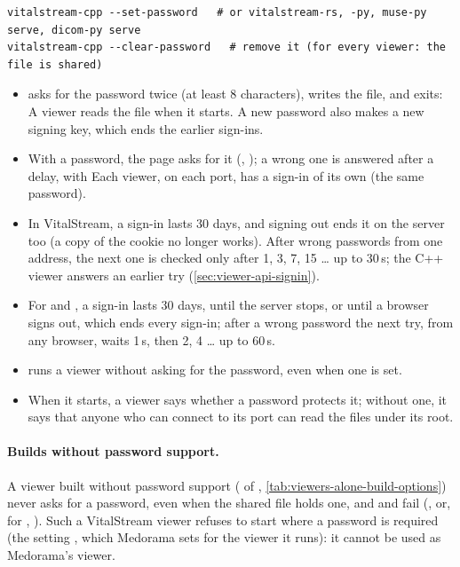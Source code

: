 \begin{lstlisting}[style=shell]
vitalstream-cpp --set-password   # or vitalstream-rs, -py, muse-py serve, dicom-py serve
vitalstream-cpp --clear-password   # remove it (for every viewer: the file is shared)
\end{lstlisting}

\begin{itemize}
\item {} asks for the password twice (at least 8 characters), writes the
  file, and exits:  A viewer
  reads the file when it starts. A new password also makes a new signing key, which ends the
  earlier sign-ins.
\item With a password, the page asks for it (, ); a wrong one is
  answered after a delay, with  Each viewer, on each port, has a sign-in
  of its own (the same password).
\item In VitalStream, a sign-in lasts 30 days, and signing out ends it on the server too (a copy
  of the cookie no longer works). After wrong passwords from one address, the next one is
  checked only after 1, 3, 7, 15 \dots{} up to 30\,s; the C++ viewer answers an earlier try
   (\cref{sec:viewer-api-signin}).
\item For  and , a sign-in lasts 30 days, until the server
  stops, or until a browser signs out, which ends every sign-in; after a wrong password the next
  try, from any browser, waits 1\,s, then 2, 4 \dots{} up to 60\,s.
\item {} runs a viewer without asking for the password, even when one is set.
\item When it starts, a viewer says whether a password protects it; without one, it says that
  anyone who can connect to its port can read the files under its root.
\end{itemize}

\paragraph{Builds without password support.} A viewer built without password support
( of , \cref{tab:viewers-alone-build-options}) never asks for
a password, even when the shared file holds one, and  and
 fail (, or, for
, ). Such a VitalStream viewer refuses to start where a
password is required (the setting , which Medorama sets for the viewer it
runs): it cannot be used as Medorama's viewer.

